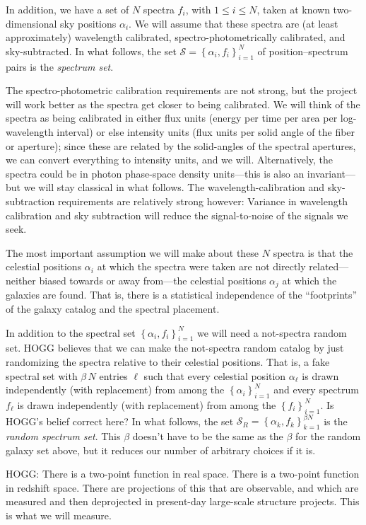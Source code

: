\documentclass{article}
\newcommand{\setof}[1]{\left\{{#1}\right\}}
\newcommand{\set}[1]{\mathscr{#1}}
\begin{document}
In addition, we have a set of $N$ spectra $f_i$, with $1\leq i\leq N$, taken at known two-dimensional sky positions $\alpha_i$.
We will assume that these spectra are (at least approximately) wavelength calibrated, spectro-photometrically calibrated, and sky-subtracted.
In what follows, the set $\set{S}=\setof{\alpha_i, f_i}_{i=1}^N$ of position--spectrum pairs is the \emph{spectrum set}.

The spectro-photometric calibration requirements are not strong, but the project will work better as the spectra get closer to being calibrated.
We will think of the spectra as being calibrated in either flux units (energy per time per area per log-wavelength interval) or else intensity units (flux units per solid angle of the fiber or aperture); since these are related by the solid-angles of the spectral apertures, we can convert everything to intensity units, and we will.
Alternatively, the spectra could be in photon phase-space density units---this is also an invariant---but we will stay classical in what follows.
The wavelength-calibration and sky-subtraction requirements are relatively strong however:
Variance in wavelength calibration and sky subtraction will reduce the signal-to-noise of the signals we seek.

The most important assumption we will make about these $N$ spectra is that the celestial positions $\alpha_i$ at which the spectra were taken are not directly related---neither biased towards or away from---the celestial positions $\alpha_j$ at which the galaxies are found.
That is, there is a statistical independence of the ``footprints'' of the galaxy catalog and the spectral placement.

In addition to the spectral set $\setof{\alpha_i, f_i}_{i=1}^N$ we will need a not-spectra random set.
HOGG believes that we can make the not-spectra random catalog by just randomizing the spectra relative to their celestial positions.
That is, a fake spectral set with $\beta\,N$ entries $\ell$ such that every celestial position $\alpha_\ell$ is drawn independently (with replacement) from among the $\setof{\alpha_i}_{i=1}^N$ and every spectrum $f_\ell$ is drawn independently (with replacement) from among the $\setof{f_i}_{i=1}^N$.
Is HOGG's belief correct here?
In what follows, the set $\set{S}_R=\setof{\alpha_k,f_k}_{k=1}^{\beta N}$ is the \emph{random spectrum set}.
This $\beta$ doesn't have to be the same as the $\beta$ for the random galaxy set above, but it reduces our number of arbitrary choices if it is.

HOGG: There is a two-point function in real space. There is a two-point function in redshift space. There are projections of this that are observable, and which are measured and then deprojected in present-day large-scale structure projects. This is what we will measure.
\end{document}
